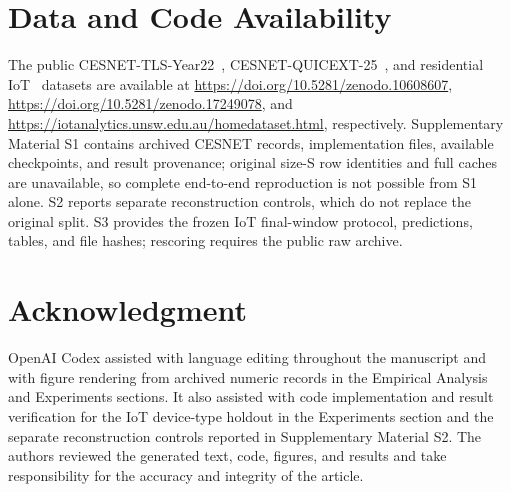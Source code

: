 \documentclass[journal]{IEEEtran}
\begin{document}
\section*{Data and Code Availability}

The public CESNET-TLS-Year22~\cite{hynek2024cesnet}, CESNET-QUICEXT-25~\cite{cesnetquicext25,mucke2025waiting}, and residential IoT~\cite{pashamokhtari2023dynamic} datasets are available at \url{https://doi.org/10.5281/zenodo.10608607}, \url{https://doi.org/10.5281/zenodo.17249078}, and \url{https://iotanalytics.unsw.edu.au/homedataset.html}, respectively. Supplementary Material S1 contains archived CESNET records, implementation files, available checkpoints, and result provenance; original size-S row identities and full caches are unavailable, so complete end-to-end reproduction is not possible from S1 alone. S2 reports separate reconstruction controls, which do not replace the original split. S3 provides the frozen IoT final-window protocol, predictions, tables, and file hashes; rescoring requires the public raw archive.

\section*{Acknowledgment}
OpenAI Codex assisted with language editing throughout the manuscript and with figure rendering from archived numeric records in the Empirical Analysis and Experiments sections. It also assisted with code implementation and result verification for the IoT device-type holdout in the Experiments section and the separate reconstruction controls reported in Supplementary Material S2. The authors reviewed the generated text, code, figures, and results and take responsibility for the accuracy and integrity of the article.



\end{document}
